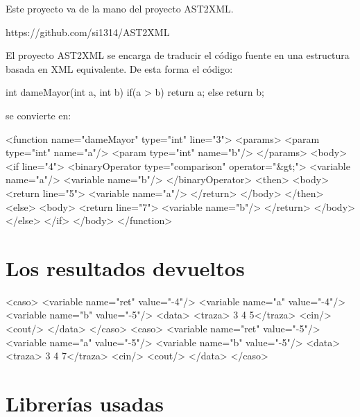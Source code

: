 Este proyecto va de la mano del proyecto AST2XML.

        https://github.com/si1314/AST2XML

El proyecto AST2XML se encarga de traducir el código fuente en una estructura basada en XML equivalente. De esta forma el código:

        int dameMayor(int a, int b){
            if(a > b){
                return a;
            }else{
                return b;
            }
        }

se convierte en:

        <function name="dameMayor" type="int" line="3">
            <params>
                <param type="int" name="a"/>
                <param type="int" name="b"/>
            </params>
            <body>
                <if line="4">
                    <binaryOperator type="comparison" operator="&gt;">
                        <variable name="a"/>
                        <variable name="b"/>
                    </binaryOperator>
                    <then>
                        <body>
                            <return line="5">
                                <variable name="a"/>
                            </return>
                        </body>
                    </then>
                    <else>
                        <body>
                            <return line="7">
                                <variable name="b"/>
                            </return>
                        </body>
                    </else>
                </if>
            </body>
        </function>

\section{Los resultados devueltos}

        <caso>
          <variable name="ret" value="-4"/>
          <variable name="a" value="-4"/>
          <variable name="b" value="-5"/>
          <data>
            <traza> 3 4 5</traza>
            <cin/>
            <cout/>
          </data>
        </caso>
        <caso>
          <variable name="ret" value="-5"/>
          <variable name="a" value="-5"/>
          <variable name="b" value="-5"/>
          <data>
            <traza> 3 4 7</traza>
            <cin/>
            <cout/>
          </data>
        </caso>

\section{Librerías usadas}

